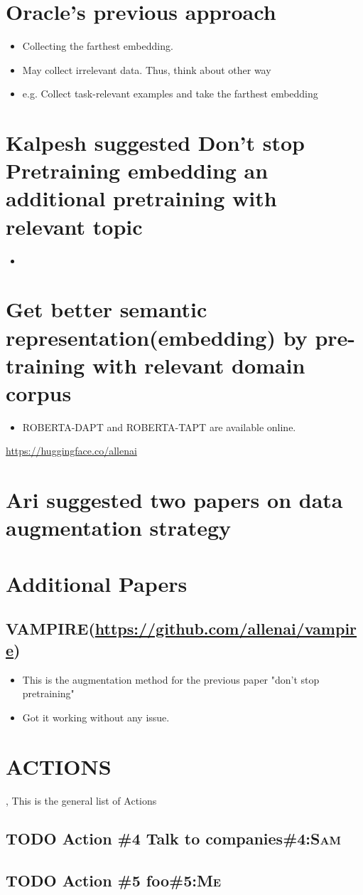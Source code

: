 \documentclass[11pt]{article}
\begin{document}
\section{Oracle’s previous approach}
\label{sec:orgdee6c8f}
\begin{itemize}
\item Collecting the farthest embedding.
\item May collect irrelevant data. Thus, think about other way
\item e.g. Collect task-relevant examples and take the farthest embedding
\end{itemize}
\section{Kalpesh suggested Don’t stop Pretraining embedding an additional pretraining with relevant topic}
\label{sec:org4869a95}
\begin{itemize}
\item 
\end{itemize}
\section{Get better semantic representation(embedding) by pre-training with relevant domain corpus}
\label{sec:org487271c}
\begin{itemize}
\item ROBERTA-DAPT and ROBERTA-TAPT are available online.
\end{itemize}

\url{https://huggingface.co/allenai}

\section{Ari suggested two papers on data augmentation strategy}
\label{sec:org7b2f8d5}

\section{Additional Papers}
\label{sec:orgd416c23}
\subsection{VAMPIRE(\url{https://github.com/allenai/vampire})}
\label{sec:orge428bed}
\begin{itemize}
\item This is the augmentation method for the previous paper "don't stop pretraining" 
\item Got it working without any issue.
\end{itemize}



\section{ACTIONS}
\label{sec:org2f99e2f}
,  This is the general list of Actions
\subsection{{\bfseries\sffamily TODO} Action \#4 Talk to companies\hfill{}\textsc{\#4:Sam}}
\label{sec:org17fd625}
\subsection{{\bfseries\sffamily TODO} Action \#5 foo\hfill{}\textsc{\#5:Me}}
\label{sec:org1aafa3b}
\end{document}
